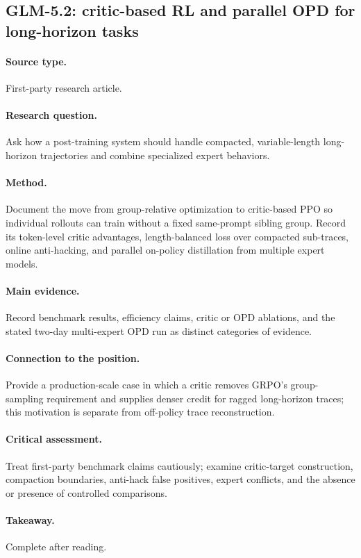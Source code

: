 \subsection{GLM-5.2: critic-based RL and parallel OPD for long-horizon tasks
\citep{glm52team2026}}
\paragraph{Source type.} First-party research article.
\paragraph{Research question.} Ask how a post-training system should handle compacted,
variable-length long-horizon trajectories and combine specialized expert behaviors.
\paragraph{Method.} Document the move from group-relative optimization to critic-based PPO
so individual rollouts can train without a fixed same-prompt sibling group. Record its
token-level critic advantages, length-balanced loss over compacted sub-traces, online
anti-hacking, and parallel on-policy distillation from multiple expert models.
\paragraph{Main evidence.} Record benchmark results, efficiency claims, critic or OPD
ablations, and the stated two-day multi-expert OPD run as distinct categories of evidence.
\paragraph{Connection to the position.} Provide a production-scale case in which a critic
removes GRPO's group-sampling requirement and supplies denser credit for ragged long-horizon
traces; this motivation is separate from off-policy trace reconstruction.
\paragraph{Critical assessment.} Treat first-party benchmark claims cautiously; examine
critic-target construction, compaction boundaries, anti-hack false positives, expert conflicts,
and the absence or presence of controlled comparisons.
\paragraph{Takeaway.} Complete after reading.
